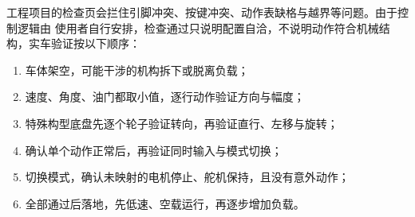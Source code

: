 工程项目的检查页会拦住引脚冲突、按键冲突、动作表缺格与越界等问题。由于控制逻辑由
使用者自行安排，检查通过只说明配置自洽，不说明动作符合机械结构，实车验证按以下顺序：

\begin{enumerate}
  \item 车体架空，可能干涉的机构拆下或脱离负载；
  \item 速度、角度、油门都取小值，逐行动作验证方向与幅度；
  \item 特殊构型底盘先逐个轮子验证转向，再验证直行、左移与旋转；
  \item 确认单个动作正常后，再验证同时输入与模式切换；
  \item 切换模式，确认未映射的电机停止、舵机保持，且没有意外动作；
  \item 全部通过后落地，先低速、空载运行，再逐步增加负载。
\end{enumerate}

